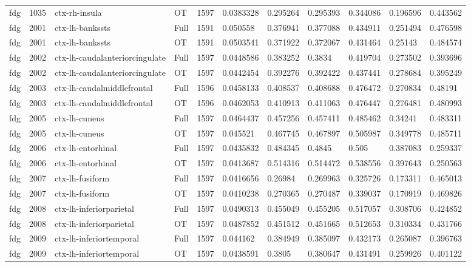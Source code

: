 \begin{landscape}
\begin{longtable}{lllllllllll}
fdg & 1035 & ctx-rh-insula & OT & 1597 & 0.0383328 & 0.295264 & 0.295393 & 0.344086 & 0.196596 & 0.443562 \\
fdg & 2001 & ctx-lh-bankssts & Full & 1591 & 0.050558 & 0.376941 & 0.377088 & 0.434911 & 0.251494 & 0.476598 \\
fdg & 2001 & ctx-lh-bankssts & OT & 1591 & 0.0503541 & 0.371922 & 0.372067 & 0.431464 & 0.25143 & 0.484574 \\
fdg & 2002 & ctx-lh-caudalanteriorcingulate & Full & 1597 & 0.0448586 & 0.383252 & 0.3834 & 0.419704 & 0.273502 & 0.393696 \\
fdg & 2002 & ctx-lh-caudalanteriorcingulate & OT & 1597 & 0.0442454 & 0.392276 & 0.392422 & 0.437441 & 0.278684 & 0.395249 \\
fdg & 2003 & ctx-lh-caudalmiddlefrontal & Full & 1596 & 0.0458133 & 0.408537 & 0.408688 & 0.476472 & 0.270834 & 0.48191 \\
fdg & 2003 & ctx-lh-caudalmiddlefrontal & OT & 1596 & 0.0462053 & 0.410913 & 0.411063 & 0.476447 & 0.276481 & 0.480993 \\
fdg & 2005 & ctx-lh-cuneus & Full & 1597 & 0.0464437 & 0.457256 & 0.457411 & 0.485462 & 0.34241 & 0.483311 \\
fdg & 2005 & ctx-lh-cuneus & OT & 1597 & 0.045521 & 0.467745 & 0.467897 & 0.505987 & 0.349778 & 0.485711 \\
fdg & 2006 & ctx-lh-entorhinal & Full & 1597 & 0.0435832 & 0.484345 & 0.4845 & 0.505 & 0.387083 & 0.259337 \\
fdg & 2006 & ctx-lh-entorhinal & OT & 1597 & 0.0413687 & 0.514316 & 0.514472 & 0.538556 & 0.397643 & 0.250563 \\
fdg & 2007 & ctx-lh-fusiform & Full & 1597 & 0.0416656 & 0.26984 & 0.269963 & 0.325726 & 0.173311 & 0.465013 \\
fdg & 2007 & ctx-lh-fusiform & OT & 1597 & 0.0410238 & 0.270365 & 0.270487 & 0.339037 & 0.170919 & 0.469826 \\
fdg & 2008 & ctx-lh-inferiorparietal & Full & 1597 & 0.0490313 & 0.455049 & 0.455205 & 0.517057 & 0.308706 & 0.424852 \\
fdg & 2008 & ctx-lh-inferiorparietal & OT & 1597 & 0.0487852 & 0.451512 & 0.451665 & 0.512653 & 0.310334 & 0.431766 \\
fdg & 2009 & ctx-lh-inferiortemporal & Full & 1597 & 0.044162 & 0.384949 & 0.385097 & 0.432173 & 0.265087 & 0.396763 \\
fdg & 2009 & ctx-lh-inferiortemporal & OT & 1597 & 0.0438591 & 0.3805 & 0.380647 & 0.431491 & 0.259926 & 0.401122 \\

\end{longtable}
\end{landscape}
